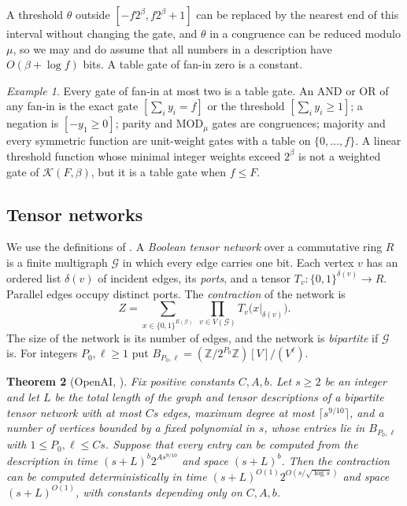 \documentclass[11pt,reqno]{amsart}
\numberwithin{equation}{section}
\theoremstyle{plain}
\newtheorem{theorem}{Theorem}[section]
\theoremstyle{definition}
\theoremstyle{remark}
\newtheorem{example}[theorem]{Example}
\newcommand{\Z}{\mathbb{Z}}
\newcommand{\cK}{\mathcal{K}}
\newcommand{\oai}{OpenAI}
\begin{document}
A threshold $\theta$ outside $[-f2^\beta,f2^\beta+1]$ can be replaced by the
nearest end of this interval without changing the gate, and $\theta$ in a
congruence can be reduced modulo $\mu$, so we may and do assume that all
numbers in a description have $O(\beta+\log f)$ bits. A table gate of fan-in
zero is a constant.

\begin{example}\label{ex:gates}
Every gate of fan-in at most two is a table gate. An AND or OR of any fan-in is
the exact gate $[\sum_iy_i=f]$ or the threshold $[\sum_iy_i\ge1]$; a negation
is $[{-y_1}\ge0]$; parity and $\mathrm{MOD}_\mu$ gates are congruences; majority
and every symmetric function are unit-weight gates with a table on
$\{0,\dots,f\}$. A linear threshold function whose minimal integer weights
exceed $2^\beta$ is not a weighted gate of $\cK(F,\beta)$, but it is a table gate
when $f\le F$.
\end{example}

\subsection{Tensor networks}
We use the definitions of \cite[Section D.1]{OAI26}. A \emph{Boolean tensor
network} over a commutative ring $R$ is a finite multigraph $\mathcal G$ in
which every edge carries one bit. Each vertex $v$ has an ordered list $\delta(v)$
of incident edges, its \emph{ports}, and a tensor $T_v:\{0,1\}^{\delta(v)}\to R$.
Parallel edges occupy distinct ports. The \emph{contraction} of the network is
\[
Z=\sum_{x\in\{0,1\}^{E(\mathcal G)}}\ \prod_{v\in V(\mathcal G)}T_v\bigl(x|_{\delta(v)}\bigr).
\]
The size of the network is its number of edges, and the network is
\emph{bipartite} if $\mathcal G$ is. For integers $P_0,\ell\ge1$ put
$B_{P_0,\ell}=(\Z/2^{P_0}\Z)[V]/(V^\ell)$.

\begin{theorem}[\oai{}, {\cite[Theorem D.1]{OAI26}}]\label{thm:contraction}
Fix positive constants $C,A,b$. Let $s\ge2$ be an integer and let $L$ be the
total length of the graph and tensor descriptions of a bipartite tensor network
with at most $Cs$ edges, maximum degree at most $\lceil s^{9/10}\rceil$, and a
number of vertices bounded by a fixed polynomial in $s$, whose entries lie in
$B_{P_0,\ell}$ with $1\le P_0,\ell\le Cs$. Suppose that every entry can be
computed from the description in time $(s+L)^b2^{As^{9/10}}$ and space
$(s+L)^b$. Then the contraction can be computed deterministically in time
$(s+L)^{O(1)}2^{O(s/\sqrt{\log s})}$ and space $(s+L)^{O(1)}$, with constants
depending only on $C,A,b$.
\end{theorem}
\end{document}
